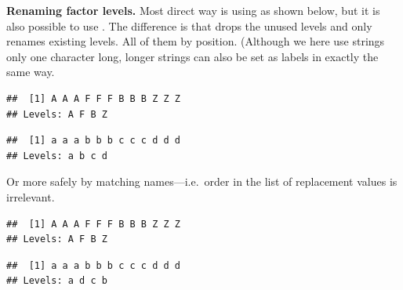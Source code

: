 \documentclass[krantz2]{krantz}\usepackage{knitr}%
\begin{document}
\begin{explainbox}
\textbf{Renaming factor levels.} Most direct way is using  as shown below, but it is also possible to use . The difference is that  drops the unused levels and  only renames existing levels. All of them by position. (Although we here use  strings only one character long, longer strings can also be set as labels in exactly the same way.
\begin{knitrout}\footnotesize
{}\color{fgcolor}\begin{kframe}
\begin{alltt}
 \hlkwb{<-} \hlstd{(}\hlstd{,} \hlstd{,}  \hlstd{=} \hlstd{(}\hlstd{,} \hlstd{,} \hlstd{,} \hlstd{))}
\end{alltt}
\begin{verbatim}
##  [1] A A A F F F B B B Z Z Z
## Levels: A F B Z
\end{verbatim}
\begin{alltt}
 \hlkwb{<-} \hlstd{(}\hlstd{,} \hlstd{,} \hlstd{,} \hlstd{)}
\end{alltt}
\begin{verbatim}
##  [1] a a a b b b c c c d d d
## Levels: a b c d
\end{verbatim}
\end{kframe}
\end{knitrout}

Or more safely by matching names---i.e.\ order in the list of replacement values is irrelevant.
\begin{knitrout}\footnotesize
{}\color{fgcolor}\begin{kframe}
\begin{alltt}
 \hlkwb{<-} \hlstd{(}\hlstd{,} \hlstd{,}  \hlstd{=} \hlstd{(}\hlstd{,} \hlstd{,} \hlstd{,} \hlstd{))}
\end{alltt}
\begin{verbatim}
##  [1] A A A F F F B B B Z Z Z
## Levels: A F B Z
\end{verbatim}
\begin{alltt}
 \hlkwb{<-} \hlstd{(} \hlstd{=} \hlstd{,}  \hlstd{=} \hlstd{,}  \hlstd{=} \hlstd{,}  \hlstd{=} \hlstd{)}
\end{alltt}
\begin{verbatim}
##  [1] a a a b b b c c c d d d
## Levels: a d c b
\end{verbatim}
\end{kframe}
\end{knitrout}


\end{explainbox}
\end{document}
